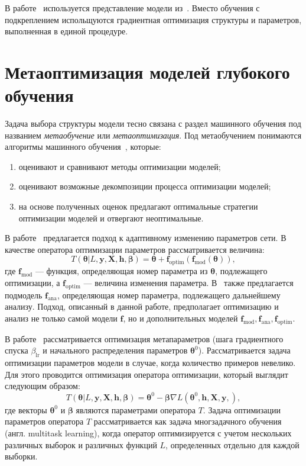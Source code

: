 В работе~\cite{darts} используется представление модели из~\cite{reinf_transfer}. Вместо обучения с подкреплением испольщуются градиентная оптимизация структуры и параметров, выполненная в единой процедуре.

\section{Метаоптимизация моделей глубокого обучения}
Задача выбора структуры модели тесно связана с раздел машинного обучения под названием \textit{метаобучение} или \textit{метаоптимизация}. Под метаобучением понимаются алгоритмы машинного обучения~\cite{metalearn}, которые:
\begin{enumerate}[1)]
\item оценивают и сравнивают методы оптимизации моделей;
\item оценивают возможные декомпозиции процесса оптимизации моделей;
\item на основе полученных оценок предлагают оптимальные стратегии оптимизации моделей и отвергают неоптимальные. 
\end{enumerate}

В работе~\cite{self_rnn} предлагается подход к адаптивному изменению параметров сети. В качестве оператора оптимизации параметров рассматривается величина:
\[
    T( \boldsymbol{\theta}| L, \mathbf{y}, \mathbf{X}, \mathbf{h}, \boldsymbol{\beta}) = \boldsymbol{\theta} + \mathbf{f}_\text{optim}(\mathbf{f}_\text{mod}( \boldsymbol{\theta})),
\]
где $\mathbf{f}_\text{mod}$ --- функция, определяющая номер параметра из $\boldsymbol{\theta}$, подлежащего оптимизации, а $ \mathbf{f}_\text{optim}$ --- величина изменения параметра. 
В~\cite{self_rnn} также предлагается подмодель $\mathbf{f}_\text{ana}$, определяющая номер параметра, подлежащего дальнейшему анализу. Подход, описанный в данной работе, предполагает оптимизацию и анализ не только самой модели $\mathbf{f}$, но и дополнительных моделей $\mathbf{f}_\text{mod}, \mathbf{f}_\text{ana}, \mathbf{f}_\text{optim}$.

В работе~\cite{meta_sgd} рассматривается оптимизация метапараметров (шага градиентного спуска $\beta_{\text{lr}}$ и начального распределения параметров $\boldsymbol{\theta}^0$). Рассматривается задача оптимизации параметров модели в случае, когда количество примеров невелико. Для этого проводится оптимизация оператора оптимизации, который выглядит следующим образом:
\[
    T(\boldsymbol{\theta}| L, \mathbf{y}, \mathbf{X},  \mathbf{h}, \boldsymbol{\beta})  = \boldsymbol{\theta}^0 - \boldsymbol{\beta}\nabla L(\boldsymbol{\theta}^0, \mathbf{h}, \mathbf{X}, \mathbf{y},),
\]
где векторы $\boldsymbol{\theta}^0$ и $\boldsymbol{\beta}$ являются параметрами оператора $T$. Задача оптимизации параметров оператора $T$ рассматривается как задача многзадачного обучения (англ. multitask learning), когда оператор оптимизируется с учетом нескольких различных выборок и различных функций $L$, определенных отдельно для каждой выборки.


